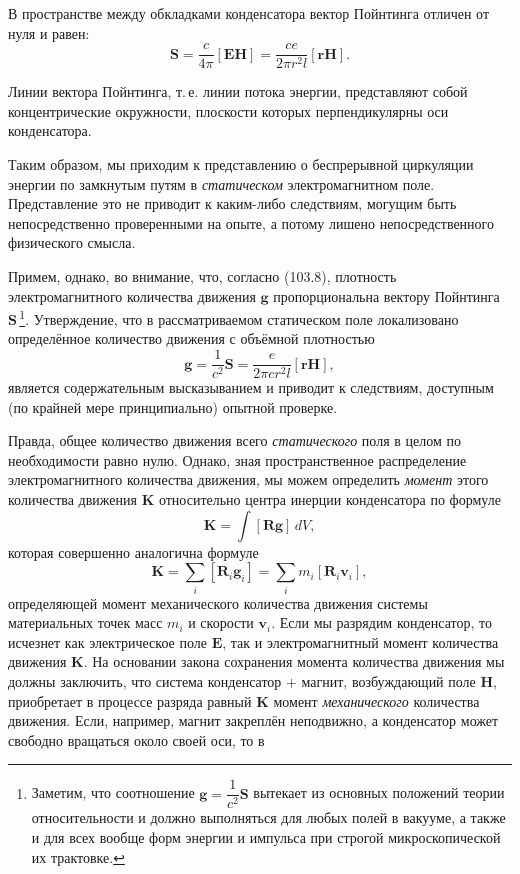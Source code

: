\documentclass[a4paper,10pt]{article}
\begin{document}
В пространстве между обкладками конденсатора вектор Пойнтинга отличен
от нуля и равен:
$$
    \mathbf{S} = \frac{c}{4\pi}[\mathbf{E}\mathbf{H}]
               = \frac{ce}{2\pi r^2 l}[\mathbf{r}\mathbf{H}].
$$


Линии вектора Пойнтинга, т.\,е. линии потока энергии, представляют
собой концентрические окружности, плоскости которых перпендикулярны
оси конденсатора.

Таким образом, мы приходим к представлению о беспрерывной циркуляции
энергии по замкнутым путям в \textit{статическом} электромагнитном поле.
Представление это не приводит к каким-либо следствиям, могущим быть
непосредственно проверенными на опыте, а потому лишено непосредственного
физического смысла.

Примем, однако, во внимание, что, согласно (103.8), плотность
электромагнитного количества движения $\mathbf{g}$ пропорциональна
вектору Пойнтинга $\mathbf{S}$\,\footnote{Заметим, что соотношение
$\mathbf{g} = \dfrac{1}{c^2}\mathbf{S}$ вытекает из основных положений
теории относительности и должно выполняться для любых полей в вакууме,
а также и для всех вообще форм энергии и импульса при строгой
микроскопической их трактовке.}. Утверждение, что в рассматриваемом
статическом поле локализовано определённое количество движения с
объёмной плотностью
\begin{equation}
    \mathbf{g} = \frac{1}{c^2}\mathbf{S} = \frac{e}{2\pi cr^2 l}[\mathbf{r}\mathbf{H}],
    \tag{104.1}
\end{equation}
является содержательным высказыванием и приводит к следствиям, доступным
(по крайней мере принципиально) опытной проверке.

Правда, общее количество движения всего \textit{статического} поля
в целом по необходимости равно нулю. Однако, зная пространственное
распределение электромагнитного количества движения, мы можем определить
\textit{момент} этого количества движения $\mathbf{K}$ относительно
центра инерции конденсатора по формуле
\begin{equation}
    \mathbf{K} = \int[\mathbf{R}\mathbf{g}]\,dV,
    \tag{104.2}
\end{equation}
которая совершенно аналогична формуле
$$
    \mathbf{K} = \sum_i[\mathbf{R}_i\mathbf{g}_i] = \sum_i m_i[\mathbf{R}_i\mathbf{v}_i],
$$
определяющей момент механического количества движения системы
материальных точек масс $m_i$ и скорости $\mathbf{v}_i$. Если мы разрядим
конденсатор, то исчезнет как электрическое поле $\mathbf{E}$, так и
электромагнитный момент количества движения $\mathbf{K}$. На основании
закона сохранения момента количества движения мы должны заключить, что
система конденсатор $+$ магнит, возбуждающий поле $\mathbf{H}$, приобретает
в процессе разряда равный $\mathbf{K}$ момент \textit{механического}
количества движения. Если, например, магнит закреплён неподвижно,
а конденсатор может свободно вращаться около своей оси, то в
\end{document}
